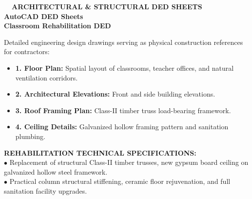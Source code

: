 \documentclass[10pt,a4paper,landscape]{article}
\begin{document}
\noindent
\begin{minipage}[t]{0.30\linewidth}
  \vspace{0pt}
  \begin{tcolorbox}[sharp corners, boxrule=0.8pt, colframe=pborder, colback=white, left=3mm, right=3mm, top=2.5mm, bottom=2.5mm, height=100mm]
    \colorbox{pred}{\fontsize{7pt}{8pt}\selectfont\bfseries\color{white}\ \ ARCHITECTURAL \& STRUCTURAL DED SHEETS\ \ }\\[1.5mm]
    {\fontsize{9.5pt}{11.5pt}\selectfont\bfseries\color{pnavy}AutoCAD DED Sheets}\\[0.5mm]
    {\fontsize{7pt}{8.5pt}\selectfont\bfseries\color{pred}Classroom Rehabilitation DED}\\[2mm]

    {\fontsize{6.5pt}{8.2pt}\selectfont\color{psteel}
    Detailed engineering design drawings serving as physical construction references for contractors:
    \begin{itemize}[leftmargin=3mm, itemsep=0.6mm, topsep=0mm]
      \item \textbf{1. Floor Plan:} Spatial layout of classrooms, teacher offices, and natural ventilation corridors.
      \item \textbf{2. Architectural Elevations:} Front and side building elevations.
      \item \textbf{3. Roof Framing Plan:} Class-II timber truss load-bearing framework.
      \item \textbf{4. Ceiling Details:} Galvanized hollow framing pattern and sanitation plumbing.
    \end{itemize}
    }
  \end{tcolorbox}
  \vspace{2mm}

  \begin{tcolorbox}[sharp corners, boxrule=0.6pt, colframe=pnavy, colback=pbglight, left=2.5mm, right=2.5mm, top=2mm, bottom=2mm, height=52mm]
    {\fontsize{7pt}{8.5pt}\selectfont\bfseries\color{pnavy}REHABILITATION TECHNICAL SPECIFICATIONS:}\\[1.5mm]
    {\fontsize{6.5pt}{8.2pt}\selectfont\color{psteel}
    $\bullet$ Replacement of structural Class-II timber trusses, new gypsum board ceiling on galvanized hollow steel framework.\\
    $\bullet$ Practical column structural stiffening, ceramic floor rejuvenation, and full sanitation facility upgrades.
    }
  \end{tcolorbox}
\end{minipage}%
\end{document}
